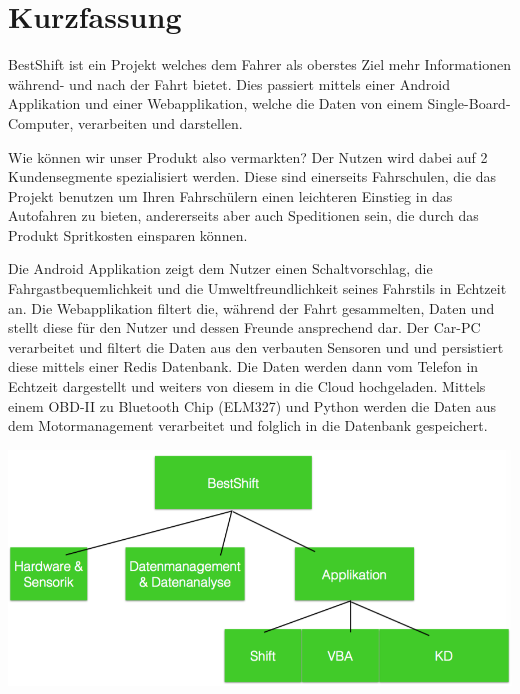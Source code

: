\chapter{Kurzfassung}

BestShift ist ein Projekt welches dem Fahrer als oberstes Ziel mehr Informationen während- und nach der Fahrt bietet. 
Dies passiert mittels einer Android Applikation und einer Webapplikation, welche die Daten von einem Single-Board-Computer, verarbeiten und darstellen. 

\newline
Wie können wir unser Produkt also vermarkten?
Der Nutzen wird dabei auf 2 Kundensegmente spezialisiert werden.
Diese sind einerseits Fahrschulen, die das Projekt benutzen um Ihren Fahrschülern einen leichteren Einstieg in das Autofahren zu bieten, andererseits aber auch Speditionen sein, die durch das Produkt Spritkosten einsparen können.

\newline
Die Android Applikation zeigt dem Nutzer einen Schaltvorschlag, die Fahrgastbequemlichkeit und die Umweltfreundlichkeit seines Fahrstils in Echtzeit an. 
Die Webapplikation filtert die, während der Fahrt gesammelten, Daten  und stellt diese für den Nutzer und dessen Freunde ansprechend dar. 
Der Car-PC verarbeitet und filtert die Daten aus den verbauten Sensoren und  und persistiert diese mittels einer Redis Datenbank. Die Daten werden dann vom Telefon in Echtzeit dargestellt und weiters von diesem in die Cloud hochgeladen. Mittels einem OBD-II zu Bluetooth Chip (ELM327) und Python werden die Daten aus dem Motormanagement verarbeitet und folglich in die Datenbank gespeichert.
\begin{center}
	\includegraphics[height=0.28\textwidth]{images/Workflowdiagramm}
\end{center}
